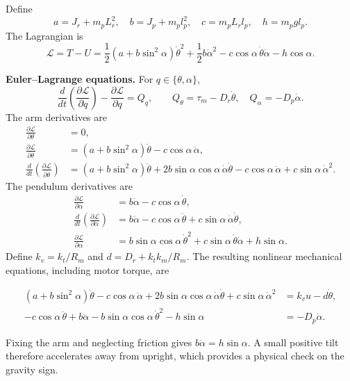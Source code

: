 \documentclass[11pt,a4paper]{article}
\begin{document}
Define
\begin{equation}\label{eq:constants}
a=J_r+m_pL_r^2,\quad b=J_p+m_pl_p^2,\quad
c=m_pL_rl_p,\quad h=m_pgl_p.
\end{equation}
The Lagrangian is
\begin{equation}\label{eq:lagrangian}
\mathcal L=T-U=
\frac12(a+b\sin^2\alpha)\dot\theta^2+\frac12b\dot\alpha^2
-c\cos\alpha\,\dot\theta\dot\alpha-h\cos\alpha.
\end{equation}

\textbf{Euler--Lagrange equations.}
For $q\in\{\theta,\alpha\}$,
\begin{equation}
\frac{d}{dt}\left(\frac{\partial\mathcal L}{\partial\dot q}\right)
-\frac{\partial\mathcal L}{\partial q}=Q_q,\qquad
Q_\theta=\tau_m-D_r\dot\theta,\quad Q_\alpha=-D_p\dot\alpha.
\end{equation}
The arm derivatives are
\begin{align}
\frac{\partial\mathcal L}{\partial\theta}&=0,\\
\frac{\partial\mathcal L}{\partial\dot\theta}
&=(a+b\sin^2\alpha)\dot\theta-c\cos\alpha\,\dot\alpha,\\
\frac{d}{dt}\left(\frac{\partial\mathcal L}{\partial\dot\theta}\right)
&=(a+b\sin^2\alpha)\ddot\theta
+2b\sin\alpha\cos\alpha\,\dot\alpha\dot\theta
-c\cos\alpha\,\ddot\alpha+c\sin\alpha\,\dot\alpha^2.
\end{align}
The pendulum derivatives are
\begin{align}
\frac{\partial\mathcal L}{\partial\dot\alpha}
&=b\dot\alpha-c\cos\alpha\,\dot\theta,\\
\frac{d}{dt}\left(\frac{\partial\mathcal L}{\partial\dot\alpha}\right)
&=b\ddot\alpha-c\cos\alpha\,\ddot\theta
+c\sin\alpha\,\dot\alpha\dot\theta,\\
\frac{\partial\mathcal L}{\partial\alpha}
&=b\sin\alpha\cos\alpha\,\dot\theta^2
+c\sin\alpha\,\dot\theta\dot\alpha+h\sin\alpha.
\end{align}
Define $k_v=k_t/R_m$ and $d=D_r+k_tk_m/R_m$. The resulting
nonlinear mechanical equations, including motor torque, are
\begin{samepage}
\begin{subequations}\label{eq:eom}
\begin{align}
(a+b\sin^2\alpha)\ddot\theta-c\cos\alpha\,\ddot\alpha
+2b\sin\alpha\cos\alpha\,\dot\alpha\dot\theta
+c\sin\alpha\,\dot\alpha^2&=k_vu-d\dot\theta,\\
-c\cos\alpha\,\ddot\theta+b\ddot\alpha
-b\sin\alpha\cos\alpha\,\dot\theta^2-h\sin\alpha&=-D_p\dot\alpha.
\end{align}
\end{subequations}
\end{samepage}
Fixing the arm and neglecting friction gives $b\ddot\alpha=h\sin\alpha$.
A small positive tilt therefore accelerates away from upright, which
provides a physical check on the gravity sign.
\end{document}

